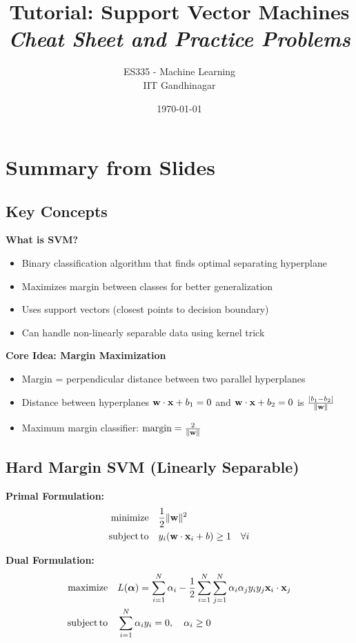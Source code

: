\documentclass{article}
\title{\textbf{Tutorial: Support Vector Machines} \\ \textit{Cheat Sheet and Practice Problems}}
\author{ES335 - Machine Learning \\ IIT Gandhinagar}
\date{\today}
\begin{document}
\maketitle

\section{Summary from Slides}

\subsection{Key Concepts}

\textbf{What is SVM?}
\begin{itemize}
    \item Binary classification algorithm that finds optimal separating hyperplane
    \item Maximizes margin between classes for better generalization
    \item Uses support vectors (closest points to decision boundary)
    \item Can handle non-linearly separable data using kernel trick
\end{itemize}

\textbf{Core Idea: Margin Maximization}
\begin{itemize}
    \item Margin = perpendicular distance between two parallel hyperplanes
    \item Distance between hyperplanes $\mathbf{w} \cdot \mathbf{x} + b_1 = 0$ and $\mathbf{w} \cdot \mathbf{x} + b_2 = 0$ is $\frac{|b_1 - b_2|}{\|\mathbf{w}\|}$
    \item Maximum margin classifier: $\text{margin} = \frac{2}{\|\mathbf{w}\|}$
\end{itemize}

\subsection{Hard Margin SVM (Linearly Separable)}

\textbf{Primal Formulation:}
\begin{align}
\operatorname{minimize} & \quad \frac{1}{2}\|\mathbf{w}\|^2 \\
\operatorname{subject\,to} & \quad y_i(\mathbf{w} \cdot \mathbf{x}_i + b) \geq 1 \quad \forall i
\end{align}

\textbf{Dual Formulation:}
\begin{align}
\operatorname{maximize} & \quad L(\boldsymbol{\alpha}) = \sum_{i=1}^{N} \alpha_i - \frac{1}{2}\sum_{i=1}^{N}\sum_{j=1}^{N} \alpha_i \alpha_j y_i y_j \mathbf{x}_i \cdot \mathbf{x}_j \\
\operatorname{subject\,to} & \quad \sum_{i=1}^{N} \alpha_i y_i = 0, \quad \alpha_i \geq 0
\end{align}
\end{document}
